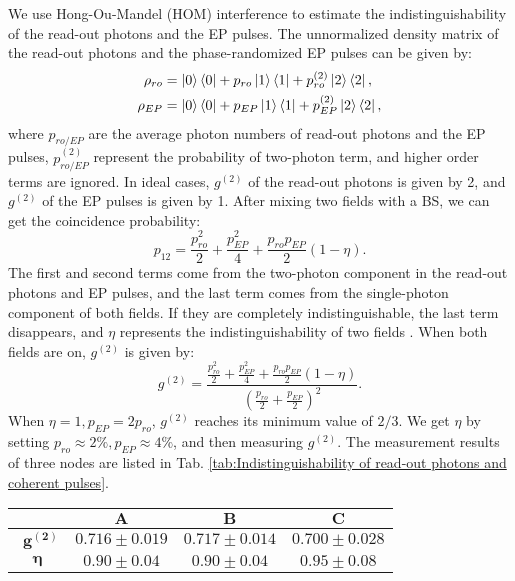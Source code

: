 \documentclass[aps,reprint,showpacs,superscriptaddress]{revtex4-2}
\begin{document}
We use Hong-Ou-Mandel (HOM) interference to estimate the indistinguishability of the read-out photons and the EP pulses. The unnormalized density matrix of the read-out photons and the phase-randomized EP pulses can be given by:
\begin{equation}
	\begin{split}
		\rho_{ro}&=\ket{0}\bra{0}+p_{ro}\ket{1}\bra{1}+p_{ro}^{(2)}\ket{2}\bra{2},\\
		\rho_{EP}&=\ket{0}\bra{0}+p_{EP}\ket{1}\bra{1}+p_{EP}^{(2)}\ket{2}\bra{2},
	\end{split}
\end{equation}
where $p_{ro/EP}$ are the average photon numbers of read-out photons and the EP pulses, $p_{ro/EP}^{(2)}$ represent the probability of two-photon term, and higher order terms are ignored. In ideal cases, $g^{(2)}$ of the read-out photons is given by 2, and $g^{(2)}$  of the EP pulses is given by 1.  After mixing two fields with a BS, we can get the coincidence probability:
\begin{equation}
	p_{12}=\frac{p_{ro}^2}{2}+\frac{p_{EP}^2}{4}+\frac{p_{ro}p_{EP}}{2}(1-\eta).
\end{equation}
The first and second terms come from the two-photon component in the read-out photons and EP pulses, and the last term comes from the single-photon component of both fields. If they are completely indistinguishable, the last term disappears, and $\eta$ represents the indistinguishability of two fields \cite{li2013sm}. When both fields are on, $g^{(2)}$ is given by:
\begin{equation}
	g^{(2)}=\frac{\frac{p_{ro}^2}{2}+\frac{p_{EP}^2}{4}+\frac{p_{ro}p_{EP}}{2}(1-\eta)}{(\frac{p_{ro}}{2}+\frac{p_{EP}}{2})^2}.
	\label{eq: g2}
\end{equation}
When $\eta=1,p_{EP}=2p_{ro}$, $g^{(2)}$ reaches its minimum value of  $2/3$. We get $\eta$ by setting $p_{ro}\approx 2\%,p_{EP}\approx 4\%$, and then measuring $g^{(2)}$. The measurement results of three nodes are listed in Tab. \ref{tab:Indistinguishability of read-out photons and coherent pulses}.
\begin{table*}[!htbp]
	\caption{$\bm{g^{(2)}}$ and $\bm{\eta}$ of three nodes}
	\label{tab:Indistinguishability of read-out photons and coherent pulses}
	\renewcommand\arraystretch{1.2}
	\begin{ruledtabular}
	\begin{tabular}{cccc}
		& $\bm{A}$ &  $\bm{B}$ & $\bm{C}$ \\
		\hline
		$\bm{\ \ g^{(2)}}$ &$0.716\pm0.019$&$0.717\pm 0.014$&$0.700\pm0.028$\\
		$\bm{\eta}$ &$0.90\pm0.04$&$0.90\pm0.04$&$0.95\pm0.08$\\
	\end{tabular}
\end{ruledtabular}
\end{table*}
\end{document}
